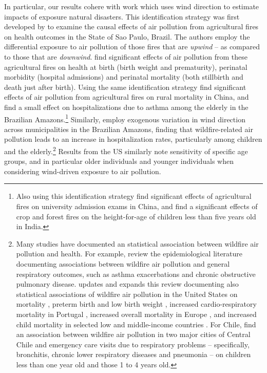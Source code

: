 \documentclass[11pt]{article}
\begin{document}
\begin{spacing}{1.5}
In particular, our results cohere with work which uses wind direction to estimate impacts of exposure natural disasters.  This identification strategy was first developed by \cite{RangelVogl2019} to examine the causal effects of air pollution from agricultural fires on health outcomes in the State of Sao Paulo, Brazil. The authors employ the differential exposure to air pollution of those fires that are \textit{upwind} -- as compared to those that are \textit{downwind}. \cite{RangelVogl2019} find significant effects of air pollution from these agricultural fires on health at birth (birth weight and prematurity), perinatal morbidity (hospital admissions) and perinatal mortality (both stillbirth and death just after birth).  Using the same identification strategy \cite{he2020straw} find significant effects of air pollution from agricultural fires on rural mortality in China, and \cite{morello2023hospitalization} find a small effect on hospitalizations due to asthma among the elderly in the Brazilian Amazons.\footnote{Also using this identification strategy \cite{graffzivin2020unintended} find significant effects of agricultural fires on university admission exams in China, and \cite{Singh2022stubble} find a significant effects of crop and forest fires on the height-for-age of children less than five years old in India.} Similarly, \citet{rocha2022winds} employ exogenous variation in wind direction across municipalities in the Brazilian Amazons, finding that wildfire-related air pollution leads to an increase in hospitalization rates, particularly among children and the elderly.\footnote{Many studies have documented an statistical association between wildfire air pollution and health. For example, \cite{reid2016critical} review the epidemiological literature documenting associations between wildfire air pollution and general respiratory outcomes, such as asthma exacerbations and chronic obstructive pulmonary disease. \cite{cascio2018wildland} updates and expands this review documenting also statistical associations of wildfire air pollution in the United States on mortality \citep{zu2016long}, preterm birth and low birth weight \citep{jones2022infant}, increased cardio-respiratory mortality in Portugal \cite{augusto2020population,tarin2021impact}, increased overall mortality in Europe \citep{kollanus2017mortality}, and increased child mortality in selected low and middle-income countries \cite{xue2021associations}. For Chile, \cite{ciciretti2022relationship} find an association between wildfire air pollution in two major cities of Central Chile and emergency care visits due to respiratory problems -- specifically, bronchitis, chronic lower respiratory diseases and pneumonia -- on children less than one year old and those 1 to 4 years old.}  Results from the US similarly note sensitivity of specific age groups, and in particular older individuals \citep{Deryuginaetal2019} and younger individuals \citep{Anderson2019} when considering wind-driven exposure to air pollution. 


\end{spacing}
\end{document}
